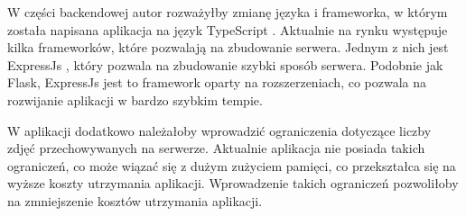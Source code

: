 W części backendowej autor rozważyłby zmianę języka i frameworka, w którym została napisana aplikacja na język TypeScript \cite{Typescript}. Aktualnie na rynku występuje kilka frameworków, które pozwalają na zbudowanie serwera. Jednym z nich jest ExpressJs \cite{express}, który pozwala na zbudowanie szybki sposób serwera. Podobnie jak Flask, ExpressJs \cite{express} jest to framework oparty na rozszerzeniach, co pozwala na rozwijanie aplikacji w bardzo szybkim tempie.

W aplikacji dodatkowo należałoby wprowadzić ograniczenia dotyczące liczby zdjęć przechowywanych na serwerze. Aktualnie aplikacja nie posiada takich ograniczeń, co może wiązać się z dużym zużyciem pamięci, co przekształca się na wyższe koszty utrzymania aplikacji. Wprowadzenie takich ograniczeń pozwoliłoby na zmniejszenie kosztów utrzymania aplikacji.

